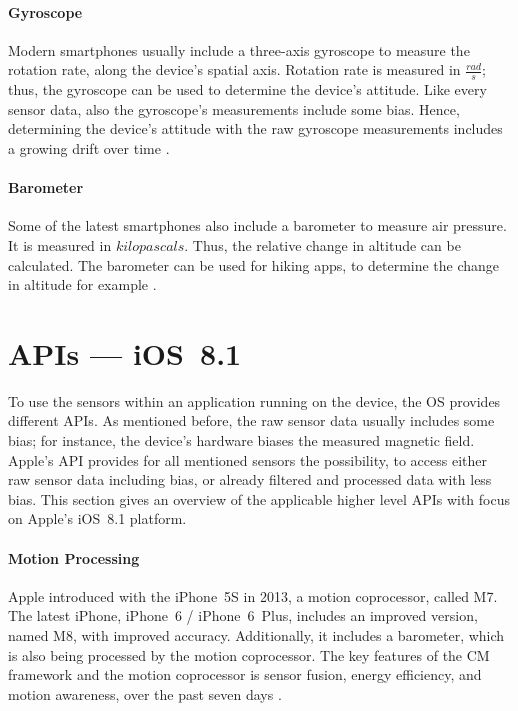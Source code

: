 \paragraph{Gyroscope}
Modern smartphones usually include a three-axis gyroscope to measure the rotation rate, along the device's spatial axis. Rotation rate is measured in $\frac{rad}{s}$; thus, the gyroscope can be used to determine the device's attitude. Like every sensor data, also the gyroscope's measurements include some bias. Hence, determining the device's attitude with the raw gyroscope measurements includes a growing drift over time \citep{apple:wwdc_2012_pham,apple:ios_doc_cm}.


\paragraph{Barometer}
Some of the latest smartphones also include a barometer to measure air pressure. It is measured in $kilo pascals$. Thus, the relative change in altitude can be calculated. The barometer can be used for hiking apps, to determine the change in altitude for example \cite{apple:ios_doc_cm}.


\section{\acsp{API} --- iOS~8.1}
To use the sensors within an application running on the device, the \ac{OS} provides different \acsp{API}. As mentioned before, the raw sensor data usually includes some bias; for instance, the device's hardware biases the measured magnetic field. Apple's \ac{API} provides for all mentioned sensors the possibility, to access either raw sensor data including bias, or already filtered and processed data with less bias. This section gives an overview of the applicable higher level \acsp{API} with focus on Apple's iOS~8.1 platform.


\paragraph{Motion Processing}
Apple introduced with the iPhone~5S in 2013, a motion coprocessor, called M7.
The latest iPhone, iPhone~6 / iPhone~6~Plus, includes an improved version, named M8, with improved accuracy. Additionally, it includes a barometer, which is also being processed by the motion coprocessor. The key features of the \ac{CM} framework and the motion coprocessor is sensor fusion, energy efficiency, and motion awareness, over the past seven days \citep{apple:wwdc_2014_pham}.

